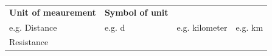 \begin{enumerate}[noitemsep, label=\textbf{\arabic*}. ]
{\begin{center}
\begin{xtabular*}{\mytablewidth}[t]{|p{10\mystarwidth}|p{10\mystarwidth}|p{10\mystarwidth}|p{10\mystarwidth}|}
        \textbf{Unit of meaurement} &
    
    
        \textbf{Symbol of unit}%
     \tabularnewline{}
    
    
        e.g. Distance &
    
    
        e.g. d &
    
    
        e.g. kilometer &
    
    
        e.g. km%
     \tabularnewline{}
    
    
        Resistance &
    
    
         &
    
    

\end{xtabular*}
\end{center}}
\end{enumerate}
